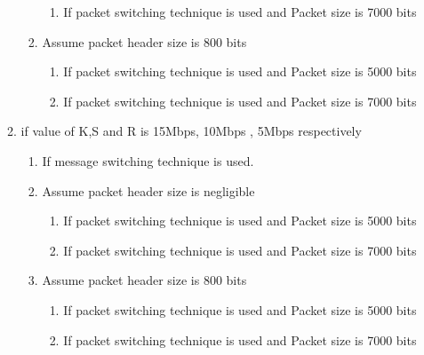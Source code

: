 \documentclass[a4paper,11pt]{article}
\begin{document}
\begin{enumerate}
\begin{enumerate}
\begin{enumerate}
\begin{enumerate}
      \item If packet switching technique is used and Packet size is 7000 bits
\end{enumerate}
\item Assume packet header size is 800 bits
\begin{enumerate}
   \item If packet switching technique is used and Packet size is 5000 bits

      \item If packet switching technique is used and Packet size is 7000 bits
\end{enumerate}
 \end{enumerate}

 \item if value of K,S and R is 15Mbps, 10Mbps , 5Mbps respectively
\begin{enumerate}
  \item If message switching technique is used.
  \item Assume packet header size is negligible
  \begin{enumerate}
    \item If packet switching technique is used and Packet size is 5000 bits

      \item If packet switching technique is used and Packet size is 7000 bits
\end{enumerate}
\item Assume packet header size is 800 bits
\begin{enumerate}
   \item If packet switching technique is used and Packet size is 5000 bits

      \item If packet switching technique is used and Packet size is 7000 bits
\end{enumerate}
 \end{enumerate}
 \end{enumerate}


\end{enumerate}
\end{document}
